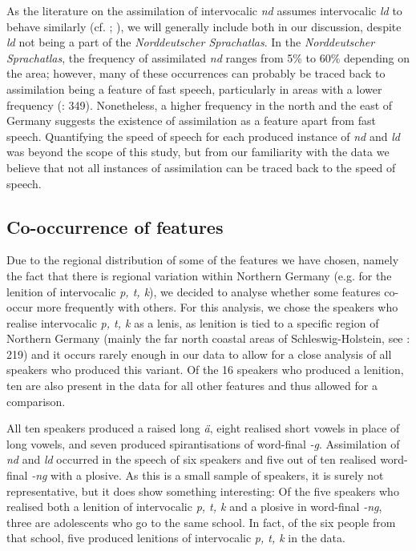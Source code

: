\documentclass[output=paper]{langsci/langscibook}
\begin{document}
As the literature on the assimilation of intervocalic \textit{nd} assumes intervocalic \textit{ld} to behave similarly (cf. \citealt{scheel_hamburger_1963}; \citealt{martens_niederdeutsch-bedingte_1988}), we will generally include both in our discussion, despite \textit{ld} not being a part of the \textit{Norddeutscher Sprachatlas}. In the \textit{Norddeutscher Sprachatlas}, the frequency of assimilated \textit{nd} ranges from 5\% to 60\% depending on the area; however, many of these occurrences can probably be traced back to assimilation being a feature of fast speech, particularly in areas with a lower frequency (\citealt{elmentaler_norddeutscher_2015}: 349). Nonetheless, a higher frequency in the north and the east of Germany suggests the existence of assimilation as a feature apart from fast speech. Quantifying the speed of speech for each produced instance of \textit{nd} and \textit{ld} was beyond the scope of this study, but from our familiarity with the data we believe that not all instances of assimilation can be traced back to the speed of speech.

\subsection{Co-occurrence of features}
\label{sec:stuhl:4.7}

Due to the regional distribution of some of the features we have chosen, namely the fact that there is regional variation within Northern Germany (e.g. for the lenition of intervocalic \textit{p, t, k}), we decided to analyse whether some features co-occur more frequently with others. For this analysis, we chose the speakers who realise intervocalic \textit{p, t, k} as a lenis, as lenition is tied to a specific region of Northern Germany (mainly the far north coastal areas of Schleswig-Holstein, see \citealt{elmentaler_norddeutscher_2015}: 219) and it occurs rarely enough in our data to allow for a close analysis of all speakers who produced this variant. Of the 16 speakers who produced a lenition, ten are also present in the data for all other features and thus allowed for a comparison. 

All ten speakers produced a raised long \textit{ä}, eight realised short vowels in place of long vowels, and seven produced spirantisations of word-final \textit{-g}. Assimilation of \textit{nd} and \textit{ld} occurred in the speech of six speakers and five out of ten realised word-final \textit{-ng} with a plosive. As this is a small sample of speakers, it is surely not representative, but it does show something interesting: Of the five speakers who realised both a lenition of intervocalic \textit{p, t, k} and a plosive in word-final \textit{-ng}, three are adolescents who go to the same school. In fact, of the six people from that school, five produced lenitions of intervocalic \textit{p, t, k} in the data. 
\end{document}
